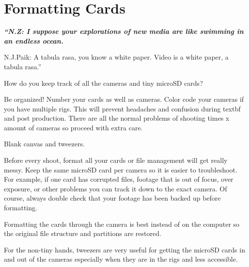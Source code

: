 \chapter{Formatting Cards}
\pagecolor{white}
\label{chap:4}
\begin{fullwidth}


{\itshape\bfseries “N.Z: I suppose your explorations of new media are like swimming in an endless ocean. 

N.J.Paik: A tabula rasa, you know a white paper. Video is a white paper, a tabula rasa.”}

\vspace{\baselineskip}

\problem

{\large How do you keep track of all the cameras and tiny microSD cards? \par}

Be organized! Number your cards as well as cameras. Color code your cameras if you have multiple rigs. This will prevent headaches and confusion during textbf{} and post production. There are all the normal problems of shooting times x amount of cameras so proceed with extra care. 


\solution

{\large Blank canvas and tweezers. \par}

Before every shoot, format all your cards or file management will get really messy. Keep the same microSD card per camera so it is easier to troubleshoot. For example, if one card has corrupted files, footage that is out of focus, over exposure, or other problems you can track it down to the exact camera. Of course, always double check that your footage has been backed up before formatting. 

Formatting the cards through the camera is best instead of on the computer so the original file structure and partitions are restored. 


\tip For the non-tiny hands, tweezers are very useful for getting the microSD cards in and out of the cameras especially when they are in the rigs and less accessible. 



\clearpage
\end{fullwidth}
